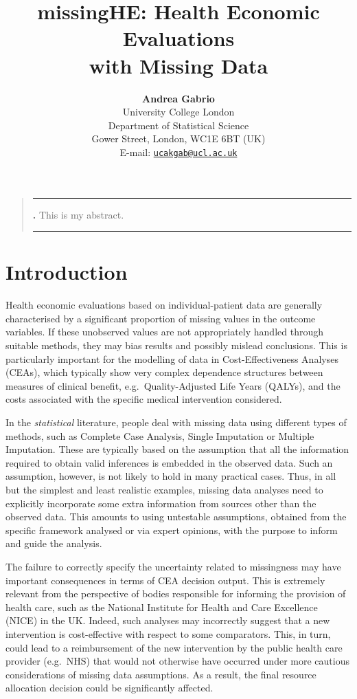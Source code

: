 \documentclass[]{article}
\title{\textbf{\Large missingHE: Health Economic Evaluations \\ with Missing Data}}
\author{\textnormal{\textbf{Andrea Gabrio}}\\
\textnormal{University College London}\\
\textnormal{Department of Statistical Science}\\
\textnormal{Gower Street, London, WC1E 6BT (UK)}\\
\textnormal{E-mail: \texttt {\href{mailto:ucakgab@ucl.ac.uk}{\nolinkurl{ucakgab@ucl.ac.uk}}}}}
\date{}
\renewenvironment{abstract}
{\begin{quote}
\noindent \rule{\linewidth}{.5pt}\par{\bfseries \abstractname.}}
{\medskip\noindent \rule{\linewidth}{.5pt}
\end{quote}
}
\begin{document}
\maketitle
\begin{abstract}
This is my abstract.\\
\end{abstract}

\section{Introduction}\label{introduction}

Health economic evaluations based on individual-patient data are
generally characterised by a significant proportion of missing values in
the outcome variables. If these unobserved values are not appropriately
handled through suitable methods, they may bias results and possibly
mislead conclusions. This is particularly important for the modelling of
data in Cost-Effectiveness Analyses (CEAs), which typically show very
complex dependence structures between measures of clinical benefit,
e.g.~Quality-Adjusted Life Years (QALYs), and the costs associated with
the specific medical intervention considered.

In the \textit{statistical} literature, people deal with missing data
using different types of methods, such as Complete Case Analysis, Single
Imputation or Multiple Imputation. These are typically based on the
assumption that all the information required to obtain valid inferences
is embedded in the observed data. Such an assumption, however, is
not likely to hold in many practical cases. Thus, in all but the
simplest and least realistic examples, missing data analyses need to
explicitly incorporate some extra information from sources other than
the observed data. This amounts to using untestable assumptions,
obtained from the specific framework analysed or via expert opinions,
with the purpose to inform and guide the analysis.

The failure to correctly specify the uncertainty related to missingness
may have important consequences in terms of CEA decision output. This is
extremely relevant from the perspective of bodies responsible for
informing the provision of health care, such as the National Institute
for Health and Care Excellence (NICE) in the UK. Indeed, such analyses
may incorrectly suggest that a new intervention is cost-effective with
respect to some comparators. This, in turn, could lead to a
reimbursement of the new intervention by the public health care provider
(e.g.~NHS) that would not otherwise have occurred under more cautious
considerations of missing data assumptions. As a result, the final
resource allocation decision could be significantly affected.
\end{document}
